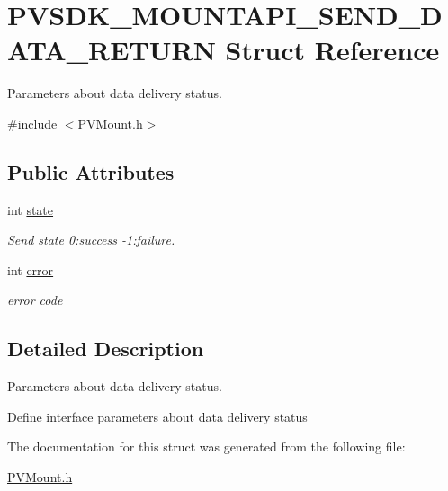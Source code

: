 \hypertarget{struct_p_v_s_d_k___m_o_u_n_t_a_p_i___s_e_n_d___d_a_t_a___r_e_t_u_r_n}{}\section{P\+V\+S\+D\+K\+\_\+\+M\+O\+U\+N\+T\+A\+P\+I\+\_\+\+S\+E\+N\+D\+\_\+\+D\+A\+T\+A\+\_\+\+R\+E\+T\+U\+RN Struct Reference}
\label{struct_p_v_s_d_k___m_o_u_n_t_a_p_i___s_e_n_d___d_a_t_a___r_e_t_u_r_n}


Parameters about data delivery status.  




{\ttfamily \#include $<$P\+V\+Mount.\+h$>$}

\subsection*{Public Attributes}
\begin{DoxyCompactItemize}
\item 
\mbox{\label{struct_p_v_s_d_k___m_o_u_n_t_a_p_i___s_e_n_d___d_a_t_a___r_e_t_u_r_n_ae87180c283f3fdaaffdaf713e14eacd3}} 
int \hyperlink{struct_p_v_s_d_k___m_o_u_n_t_a_p_i___s_e_n_d___d_a_t_a___r_e_t_u_r_n_ae87180c283f3fdaaffdaf713e14eacd3}{state}
\begin{DoxyCompactList}\small\item\em Send state 0\+:success -\/1\+:failure. \end{DoxyCompactList}\item 
\mbox{\label{struct_p_v_s_d_k___m_o_u_n_t_a_p_i___s_e_n_d___d_a_t_a___r_e_t_u_r_n_a40696060476ab7bcb90b741d2b4dde18}} 
int \hyperlink{struct_p_v_s_d_k___m_o_u_n_t_a_p_i___s_e_n_d___d_a_t_a___r_e_t_u_r_n_a40696060476ab7bcb90b741d2b4dde18}{error}
\begin{DoxyCompactList}\small\item\em error code \end{DoxyCompactList}\end{DoxyCompactItemize}


\subsection{Detailed Description}
Parameters about data delivery status. 

Define interface parameters about data delivery status 

The documentation for this struct was generated from the following file\+:\begin{DoxyCompactItemize}
\item 
\hyperlink{_p_v_mount_8h}{P\+V\+Mount.\+h}\end{DoxyCompactItemize}
